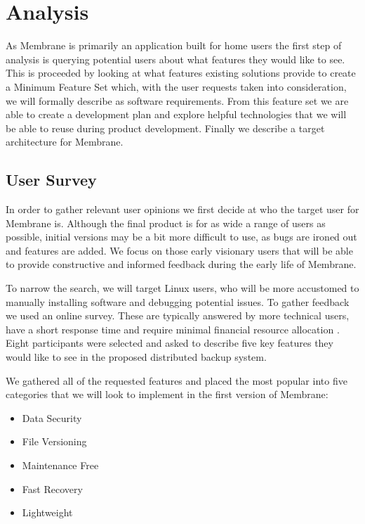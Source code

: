 \documentclass[11pt, a4paper, twocolumn, twoside]{report}
\begin{document}
\chapter{Analysis}

As Membrane is primarily an application built for home users the first step of analysis is querying potential users about what features they would like to see. This is proceeded by looking at what features existing solutions provide to create a Minimum Feature Set which, with the user requests taken into consideration, we will formally describe as software requirements. From this feature set we are able to create a development plan and explore helpful technologies that we will be able to reuse during product development. Finally we describe a target architecture for Membrane.

\section{User Survey}

In order to gather relevant user opinions we first decide at who the target user for Membrane is. Although the final product is for as wide a range of users as possible, initial versions may be a bit more difficult to use, as bugs are ironed out and features are added. We focus on those early visionary users that will be able to provide constructive and informed feedback during the early life of Membrane. \label{txt:adv-users}

To narrow the search, we will target Linux users, who will be more accustomed to manually installing software and debugging potential issues. To gather feedback we used an online survey. These are typically answered by more technical users, have a short response time and require minimal financial resource allocation \citep{ilieva2002online}. Eight participants were selected and asked to describe five key features they would like to see in the proposed distributed backup system.

We gathered all of the requested features and placed the most popular into five categories that we will look to implement in the first version of Membrane:

\begin{itemize}
 \item Data Security
 \item File Versioning
 \item Maintenance Free
 \item Fast Recovery
 \item Lightweight
\end{itemize}
\end{document}
